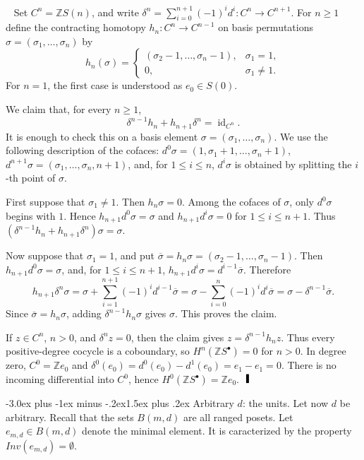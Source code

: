 \documentclass[12pt,a4paper]{article}
\makeatletter
\newenvironment{proof}{\noindent{\bf Proof}~}%
{\hfill$\qed$\medskip}
\def\qed{ \ \vrule width.1cm height.3cm depth0cm}
\renewcommand{\subsection}{\@startsection{subsection}{2}{0pt}%
{-3.0ex plus -1ex minus -.2ex}{-1.5ex plus .2ex}%
{\normalfont\large\bf}}
\renewcommand{\subsection}{\@startsection{subsection}{2}{0pt}%
{-3.0ex plus -1ex minus -.2ex}{1.5ex plus .2ex}%
{\normalfont\large\bf}}
\def\bar{\overline}
\renewcommand{\subsection}{\@startsection{subsection}{2}{0pt}%
{-3.0ex plus -1ex minus -.2ex}{-1.5ex plus .2ex}%
{\normalfont\normalsize\bf}}
\renewcommand{\subsection}{\@startsection{subsection}{2}{0pt}%
{-3.0ex plus -1ex minus -.2ex}{1.5ex plus .2ex}%
{\normalfont\normalsize\bf}}
\def\bar{\overline}
\makeatother
\begin{document}
\begin{proof}
Set \(C^n={\mathbb Z}S(n)\), and write
\(\delta^n=\sum_{i=0}^{n+1}(-1)^i d^i:C^n\to C^{n+1}\).  For \(n\geq 1\)
define the contracting homotopy \(h_n:C^n\to C^{n-1}\) on basis permutations
\(\sigma=(\sigma_1,\ldots,\sigma_n)\) by
\[
h_n(\sigma)=
\begin{cases}
(\sigma_2-1,\ldots,\sigma_n-1),& \sigma_1=1,\\
0,& \sigma_1\neq 1.
\end{cases}
\]
For \(n=1\), the first case is understood as \(e_0\in S(0)\).

We claim that, for every \(n\geq 1\),
\[
\delta^{n-1}h_n+h_{n+1}\delta^n=\operatorname{id}_{C^n}.
\]
It is enough to check this on a basis element
\(\sigma=(\sigma_1,\ldots,\sigma_n)\).  We use the following description of the
cofaces: \(d^0\sigma=(1,\sigma_1+1,\ldots,\sigma_n+1)\),
\(d^{n+1}\sigma=(\sigma_1,\ldots,\sigma_n,n+1)\), and, for \(1\leq i\leq n\),
\(d^i\sigma\) is obtained by splitting the \(i\)-th point of \(\sigma\).

First suppose that \(\sigma_1\neq 1\).  Then \(h_n\sigma=0\).  Among the cofaces
of \(\sigma\), only \(d^0\sigma\) begins with \(1\).  Hence
\(h_{n+1}d^0\sigma=\sigma\) and \(h_{n+1}d^i\sigma=0\) for \(1\leq i\leq n+1\).
Thus \((\delta^{n-1}h_n+h_{n+1}\delta^n)\sigma=\sigma\).

Now suppose that \(\sigma_1=1\), and put
\(\bar\sigma=h_n\sigma=(\sigma_2-1,\ldots,\sigma_n-1)\).  Then
\(h_{n+1}d^0\sigma=\sigma\), and, for \(1\leq i\leq n+1\),
\(h_{n+1}d^i\sigma=d^{i-1}\bar\sigma\).  Therefore
\[
h_{n+1}\delta^n\sigma
=\sigma+\sum_{i=1}^{n+1}(-1)^i d^{i-1}\bar\sigma
=\sigma-\sum_{i=0}^{n}(-1)^i d^i\bar\sigma
=\sigma-\delta^{n-1}\bar\sigma.
\]
Since \(\bar\sigma=h_n\sigma\), adding \(\delta^{n-1}h_n\sigma\) gives \(\sigma\).
This proves the claim.

If \(z\in C^n\), \(n>0\), and \(\delta^n z=0\), then the claim gives
\(z=\delta^{n-1}h_nz\).  Thus every positive-degree cocycle is a coboundary, so
\(H^n({\mathbb Z}S^\bullet)=0\) for \(n>0\).  In degree zero,
\(C^0={\mathbb Z}e_0\) and
\(\delta^0(e_0)=d^0(e_0)-d^1(e_0)=e_1-e_1=0\).  There is no incoming
differential into \(C^0\), hence \(H^0({\mathbb Z}S^\bullet)={\mathbb Z}e_0\).
\end{proof}



\subsection{Arbitrary $d$: the units.} Let now $d$ be arbitrary. Recall that the sets 
$B(m,d)$ are 
all ranged posets. Let $e_{m,d}\in B(m,d)$ denote the minimal element. It is caracterized by the property $Inv(e_{m,d}) = \emptyset$.
\end{document}

